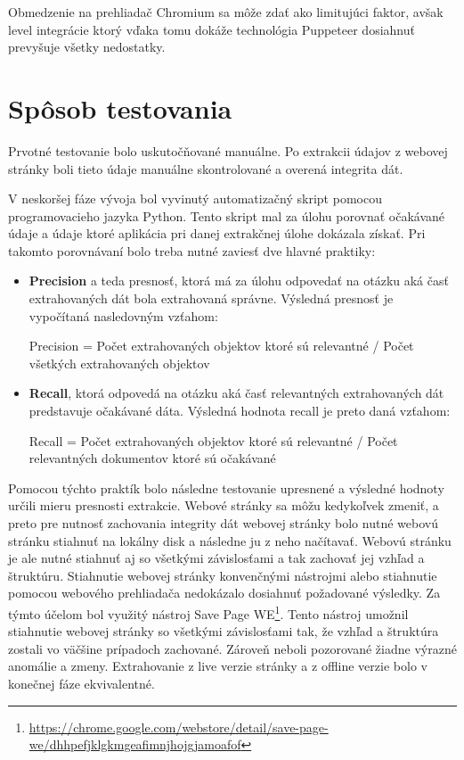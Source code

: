 Obmedzenie na prehliadač Chromium sa môže zdať ako limitujúci faktor, avšak level integrácie ktorý vďaka tomu dokáže technológia Puppeteer dosiahnuť prevyšuje všetky nedostatky.

\section{Spôsob testovania}
\label{sposobytestu}

Prvotné testovanie bolo uskutočňované manuálne. Po extrakcii údajov z webovej stránky boli tieto údaje manuálne skontrolované a overená integrita dát. 

V neskoršej fáze vývoja bol vyvinutý automatizačný skript pomocou programovacieho jazyka Python. Tento skript mal za úlohu porovnať očakávané údaje a údaje ktoré aplikácia pri danej extrakčnej úlohe dokázala získať. Pri takomto porovnávaní bolo treba nutné zaviesť dve hlavné praktiky\cite{precrecall}:

\begin{itemize}
    \item \textbf{Precision} a teda presnosť, ktorá má za úlohu odpovedať na otázku aká časť extrahovaných dát bola extrahovaná správne. Výsledná presnosť je vypočítaná nasledovným vzťahom:
   
    Precision  =   Počet extrahovaných objektov ktoré sú relevantné / Počet všetkých extrahovaných objektov
    
    \item \textbf{Recall}, ktorá odpovedá na otázku aká časť relevantných extrahovaných dát predstavuje očakávané dáta. Výsledná hodnota recall je preto daná vzťahom:
    
    Recall = Počet extrahovaných objektov ktoré sú relevantné / Počet relevantných dokumentov ktoré sú očakávané
\end{itemize}

\bigskip

Pomocou týchto praktík bolo následne testovanie upresnené a výsledné hodnoty určili mieru presnosti extrakcie. Webové stránky sa môžu kedykoľvek zmeniť, a preto pre nutnosť zachovania integrity dát webovej stránky bolo nutné webovú stránku stiahnuť na lokálny disk a následne ju z neho načítavať. Webovú stránku je ale nutné stiahnuť aj so všetkými závislosťami a tak zachovať jej vzhľad a štruktúru. Stiahnutie webovej stránky konvenčnými nástrojmi alebo stiahnutie pomocou webového prehliadača nedokázalo dosiahnuť požadované výsledky. Za týmto účelom bol využitý nástroj Save Page WE\footnote{\url{https://chrome.google.com/webstore/detail/save-page-we/dhhpefjklgkmgeafimnjhojgjamoafof}}. Tento nástroj umožnil stiahnutie webovej stránky so všetkými závislosťami tak, že vzhľad a štruktúra zostali vo väčšine prípadoch zachované. Zároveň neboli pozorované žiadne výrazné anomálie a zmeny. Extrahovanie z live verzie stránky a z offline verzie bolo v konečnej fáze ekvivalentné. 

